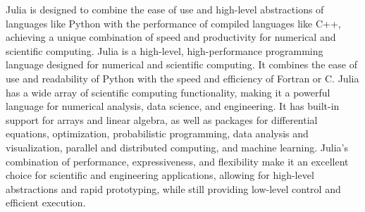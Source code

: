 Julia is designed to combine the ease of use and high-level abstractions of languages like Python with the performance of compiled languages like C++, achieving a unique combination of speed and productivity for numerical and scientific computing.  Julia is a high-level, high-performance programming language designed for numerical and scientific computing. It combines the ease of use and readability of Python with the speed and efficiency of Fortran or C.   Julia has a wide array of scientific computing functionality, making it a powerful language for numerical analysis, data science, and engineering. It has built-in support for arrays and linear algebra, as well as packages for differential equations, optimization, probabilistic programming, data analysis and visualization, parallel and distributed computing, and machine learning. Julia's combination of performance, expressiveness, and flexibility make it an excellent choice for scientific and engineering applications, allowing for high-level abstractions and rapid prototyping, while still providing low-level control and efficient execution.

